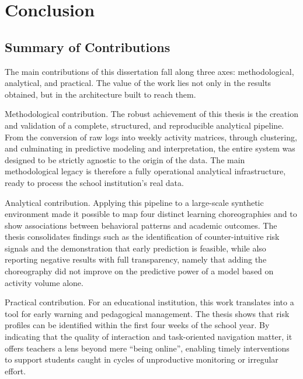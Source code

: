 \chapter{Conclusion}
\label{chap:conclusion}


\section{Summary of Contributions}
\label{sec:contributions}

The main contributions of this dissertation fall along three axes: methodological, analytical, and practical. The value of the work lies not only in the results obtained, but in the architecture built to reach them.

Methodological contribution. The robust achievement of this thesis is the creation and validation of a complete, structured, and reproducible analytical pipeline. From the conversion of raw logs into weekly activity matrices, through clustering, and culminating in predictive modeling and interpretation, the entire system was designed to be strictly agnostic to the origin of the data. The main methodological legacy is therefore a fully operational analytical infrastructure, ready to process the school institution's real data.

Analytical contribution. Applying this pipeline to a large-scale synthetic environment made it possible to map four distinct learning choreographies and to show associations between behavioral patterns and academic outcomes. The thesis consolidates findings such as the identification of counter-intuitive risk signals and the demonstration that early prediction is feasible, while also reporting negative results with full transparency, namely that adding the choreography did not improve on the predictive power of a model based on activity volume alone.

Practical contribution. For an educational institution, this work translates into a tool for early warning and pedagogical management. The thesis shows that risk profiles can be identified within the first four weeks of the school year. By indicating that the quality of interaction and task-oriented navigation matter, it offers teachers a lens beyond mere ``being online'', enabling timely interventions to support students caught in cycles of unproductive monitoring or irregular effort.

